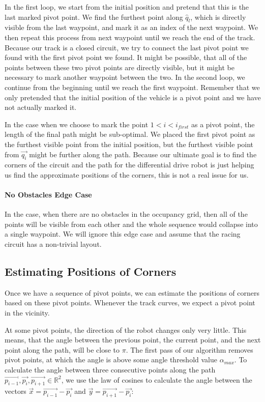 In the first loop, we start from the initial position and pretend that this is the last marked pivot point. We find the furthest point along $\hat{q}_l$, which is directly visible from the last waypoint, and mark it as an index of the next waypoint. We then repeat this process from next waypoint until we reach the end of the track. Because our track is a closed circuit, we try to connect the last pivot point we found with the first pivot point we found. It might be possible, that all of the points between these two pivot points are directly visible, but it might be necessary to mark another waypoint between the two. In the second loop, we continue from the beginning until we reach the first waypoint. Remember that we only pretended that the initial position of the vehicle is a pivot point and we have not actually marked it.

In the case when we choose to mark the point $1<i<i_{first}$ as a pivot point, the length of the final path might be sub-optimal. We placed the first pivot point as the furthest visible point from the initial position, but the furthest visible point from $\vec{q_i}$ might be further along the path. Because our ultimate goal is to find the corners of the circuit and the path for the differential drive robot is just helping us find the approximate positions of the corners, this is not a real issue for us.

\paragraph{No Obstacles Edge Case} In the case, when there are no obstacles in the occupancy grid, then all of the points will be visible from each other and the whole sequence would collapse into a single waypoint. We will ignore this edge case and assume that the racing circuit has a non-trivial layout.

\subsection{Estimating Positions of Corners}

Once we have a sequence of pivot points, we can estimate the positions of corners based on these pivot points. Whenever the track curves, we expect a pivot point in the vicinity.

At some pivot points, the direction of the robot changes only very little. This means, that the angle between the previous point, the current point, and the next point along the path, will be close to $\pi$. The first pass of our algorithm removes pivot points, at which the angle is above some angle threshold value $\alpha_{max}$. To calculate the angle between three consecutive points along the path $\vec{p_{i-1}}, \vec{p_i}, \vec{p_{i+1}}\in\mathbb{R}^2$, we use the law of cosines to calculate the angle between the vectors $\vec{x}=\vec{p_{i-1}}-\vec{p_i}$ and $\vec{y}=\vec{p_{i+1}}-\vec{p_i}$:

